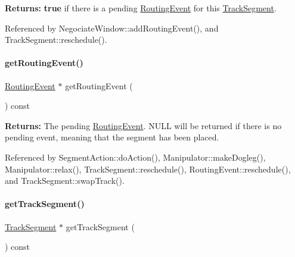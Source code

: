 {\bfseries Returns\+:} {\bfseries true} if there is a pending \mbox{\hyperlink{classKite_1_1RoutingEvent}{Routing\+Event}} for this \mbox{\hyperlink{classKite_1_1TrackSegment}{Track\+Segment}}. 

Referenced by Negociate\+Window\+::add\+Routing\+Event(), and Track\+Segment\+::reschedule().

\mbox{\label{classKite_1_1DataNegociate_a831dab8eb708da17b4f1e1a8c057f283}} 
\paragraph{\texorpdfstring{get\+Routing\+Event()}{getRoutingEvent()}}
{\footnotesize\ttfamily \mbox{\hyperlink{classKite_1_1RoutingEvent}{Routing\+Event}} $\ast$ get\+Routing\+Event (\begin{DoxyParamCaption}{ }\end{DoxyParamCaption}) const\hspace{0.3cm}{\ttfamily [inline]}}

{\bfseries Returns\+:} The pending \mbox{\hyperlink{classKite_1_1RoutingEvent}{Routing\+Event}}. {\ttfamily N\+U\+LL} will be returned if there is no pending event, meaning that the segment has been placed. 

Referenced by Segment\+Action\+::do\+Action(), Manipulator\+::make\+Dogleg(), Manipulator\+::relax(), Track\+Segment\+::reschedule(), Routing\+Event\+::reschedule(), and Track\+Segment\+::swap\+Track().

\mbox{\label{classKite_1_1DataNegociate_abc97e384245eab238831f9461968025b}} 
\paragraph{\texorpdfstring{get\+Track\+Segment()}{getTrackSegment()}}
{\footnotesize\ttfamily \mbox{\hyperlink{classKite_1_1TrackSegment}{Track\+Segment}} $\ast$ get\+Track\+Segment (\begin{DoxyParamCaption}{ }\end{DoxyParamCaption}) const\hspace{0.3cm}{\ttfamily [inline]}}

